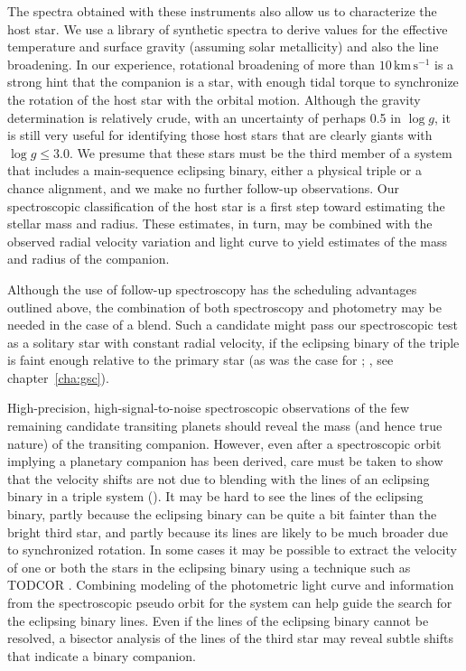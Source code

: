 The spectra obtained with these instruments also allow us to characterize the host star. We use a library of synthetic spectra to derive values for the effective temperature and surface gravity (assuming solar metallicity) and also the line broadening.  In our experience, rotational broadening of more than $10\,\mathrm{km\,s^{-1}}$ is a strong hint that the companion is a star, with enough tidal torque to synchronize the rotation of the host star with the orbital motion. Although the gravity determination is relatively crude, with an uncertainty of perhaps 0.5 in $\log{g}$, it is still very useful for identifying those host stars that are clearly giants with $\log{g} \leq 3.0$.  We presume that these stars must be the third member of a system that includes a main-sequence eclipsing binary, either a physical triple or a chance alignment, and we make no further follow-up observations. Our spectroscopic classification of the host star is a first step toward estimating the stellar mass and radius. These estimates, in turn, may be combined with the observed radial velocity variation and light curve to yield estimates of the mass and radius of the companion. 

Although the use of follow-up spectroscopy has the scheduling advantages outlined above, the combination of both spectroscopy and photometry may be needed in the case of a blend. Such a candidate might pass our spectroscopic test as a solitary star with constant radial velocity, if the eclipsing binary of the triple is faint enough relative to the primary star (as was the case for \gscOTE; \citealt{ODonovan_Charbonneau_Torres:apj:2006a}, see chapter~\ref{cha:gsc}).

High-precision, high-signal-to-noise spectroscopic observations of the few remaining candidate transiting planets should reveal the mass (and hence true nature) of the transiting companion. However, even after a spectroscopic orbit implying a planetary companion has been derived, care must be taken to show that the velocity shifts are not due to blending with the lines of an eclipsing binary in a triple system (\citealp[e.g.,][]{Mandushev_Torres_Latham:apj:2005a}). It may be hard to see the lines of the eclipsing binary, partly because the eclipsing binary can be quite a bit fainter than the bright third star, and partly because its lines are likely to be much broader due to synchronized rotation.  In some cases it may be possible to extract the velocity of one or both the stars in the eclipsing binary using a technique such as TODCOR \citep{Mandushev_Torres_Latham:apj:2005a}. Combining modeling of the photometric light curve and information from the spectroscopic pseudo orbit for the system can help guide the search for the eclipsing binary lines.  Even if the lines of the eclipsing binary cannot be resolved, a bisector analysis of the lines of the third star may reveal subtle shifts that indicate a binary companion.


